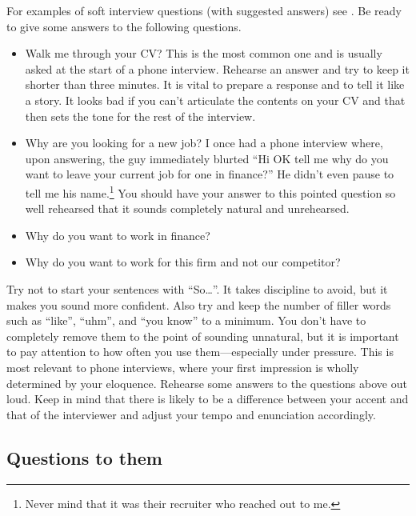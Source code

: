\documentclass[a4paper]{article}
\begin{document}
For examples of soft interview questions (with suggested answers) see \citet{JoshiQA}.
Be ready to give some answers to the following questions.
\begin{itemize}
  \item Walk me through your CV?
  This is the most common one and is usually asked at the start of a phone interview.
  Rehearse an answer and try to keep it shorter than three minutes.
  It is vital to prepare a response and to tell it like a story.
  It looks bad if you can't articulate the contents on your CV and that then sets the tone for the rest of the interview.
  \item Why are you looking for a new job?
  I once had a phone interview where, upon answering, the guy immediately blurted ``Hi OK tell me why do you want to leave your current job for one in finance?''
  He didn't even pause to tell me his name.\footnote{Never mind that it was their recruiter who reached out to me.}
  You should have your answer to this pointed question so well rehearsed that it sounds completely natural and unrehearsed.
  \item Why do you want to work in finance?
  \item Why do you want to work for this firm and not our competitor?
\end{itemize}
%
Try not to start your sentences with ``So\ldots''.
It takes discipline to avoid, but it makes you sound more confident.
Also try and keep the number of filler words such as ``like'', ``uhm'', and ``you know'' to a minimum.
You don't have to completely remove them to the point of sounding unnatural, but it is important to pay attention to how often you use them---especially under pressure.
This is most relevant to phone interviews, where your first impression is wholly determined by your eloquence.
Rehearse some answers to the questions above out loud.
Keep in mind that there is likely to be a difference between your accent and that of the interviewer and adjust your tempo and enunciation accordingly.

\subsection{Questions to them}
\end{document}

